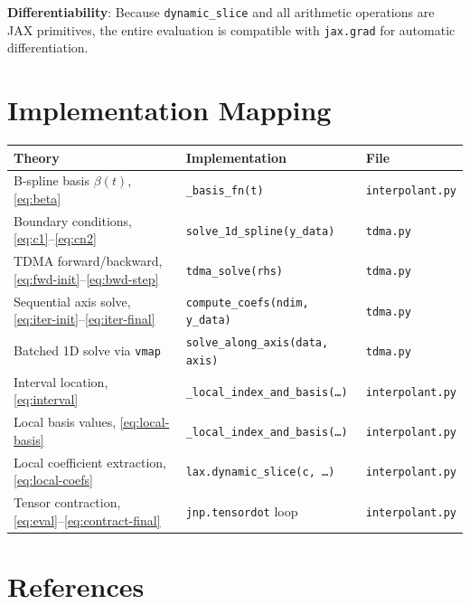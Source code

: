 \documentclass[11pt,a4paper]{article}
\begin{document}
\textbf{Differentiability}: Because \texttt{dynamic\_slice} and all
arithmetic operations are JAX primitives, the entire evaluation is
compatible with \texttt{jax.grad} for automatic differentiation.

\section{Implementation Mapping}

\begin{longtable}{@{} p{5cm} p{5.5cm} p{4cm} @{}}
\toprule
Theory & Implementation & File \\
\midrule
\endhead
B-spline basis $\beta(t)$, \eqref{eq:beta}
  & \texttt{\_basis\_fn(t)}
  & \texttt{interpolant.py} \\
Boundary conditions, \eqref{eq:c1}--\eqref{eq:cn2}
  & \texttt{solve\_1d\_spline(y\_data)}
  & \texttt{tdma.py} \\
TDMA forward/backward, \eqref{eq:fwd-init}--\eqref{eq:bwd-step}
  & \texttt{tdma\_solve(rhs)}
  & \texttt{tdma.py} \\
Sequential axis solve, \eqref{eq:iter-init}--\eqref{eq:iter-final}
  & \texttt{compute\_coefs(ndim, y\_data)}
  & \texttt{tdma.py} \\
Batched 1D solve via \texttt{vmap}
  & \texttt{solve\_along\_axis(data, axis)}
  & \texttt{tdma.py} \\
Interval location, \eqref{eq:interval}
  & \texttt{\_local\_index\_and\_basis(\ldots)}
  & \texttt{interpolant.py} \\
Local basis values, \eqref{eq:local-basis}
  & \texttt{\_local\_index\_and\_basis(\ldots)}
  & \texttt{interpolant.py} \\
Local coefficient extraction, \eqref{eq:local-coefs}
  & \texttt{lax.dynamic\_slice(c, \ldots)}
  & \texttt{interpolant.py} \\
Tensor contraction, \eqref{eq:eval}--\eqref{eq:contract-final}
  & \texttt{jnp.tensordot} loop
  & \texttt{interpolant.py} \\
\bottomrule
\end{longtable}

\section{References}
\end{document}
